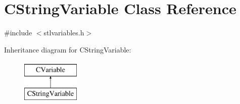 \hypertarget{classCStringVariable}{\section{C\-String\-Variable Class Reference}
\label{classCStringVariable}
}


{\ttfamily \#include $<$stlvariables.\-h$>$}

Inheritance diagram for C\-String\-Variable\-:\begin{figure}[H]
\begin{center}
\leavevmode
\includegraphics[height=2.000000cm]{de/df0/classCStringVariable}
\end{center}
\end{figure}
